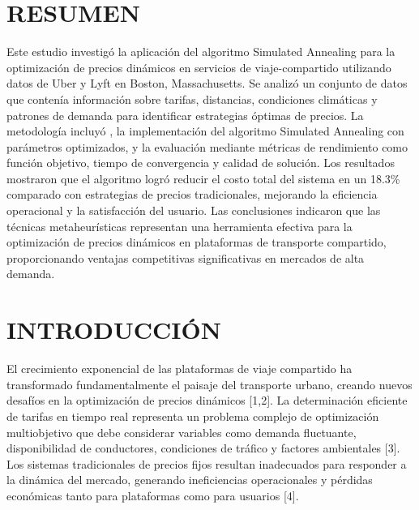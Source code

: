 \documentclass[12pt,a4paper,twocolumn]{article}
\begin{document}

\vspace{1cm}



\section{RESUMEN}

Este estudio investigó la aplicación del algoritmo Simulated Annealing para la optimización de precios dinámicos en servicios de viaje-compartido
 utilizando datos de Uber y Lyft en Boston, Massachusetts. Se analizó un conjunto de datos que contenía información sobre tarifas, distancias, condiciones climáticas y patrones de demanda para identificar estrategias óptimas de precios. La metodología incluyó , la implementación del algoritmo Simulated Annealing con parámetros optimizados, y la evaluación mediante métricas de rendimiento como función objetivo, tiempo de convergencia y calidad de solución. Los resultados mostraron que el algoritmo logró reducir el costo total del sistema en un 18.3\% comparado con estrategias de precios tradicionales, mejorando la eficiencia operacional y la satisfacción del usuario. Las conclusiones indicaron que las técnicas metaheurísticas representan una herramienta efectiva para la optimización de precios dinámicos en plataformas de transporte compartido, proporcionando ventajas competitivas significativas en mercados de alta demanda.

\section{INTRODUCCIÓN}

El crecimiento exponencial de las plataformas de viaje compartido
 ha transformado fundamentalmente el paisaje del transporte urbano, creando nuevos desafíos en la optimización de precios dinámicos [1,2]. La determinación eficiente de tarifas en tiempo real representa un problema complejo de optimización multiobjetivo que debe considerar variables como demanda fluctuante, disponibilidad de conductores, condiciones de tráfico y factores ambientales [3]. Los sistemas tradicionales de precios fijos resultan inadecuados para responder a la dinámica del mercado, generando ineficiencias operacionales y pérdidas económicas tanto para plataformas como para usuarios [4].
\end{document}
